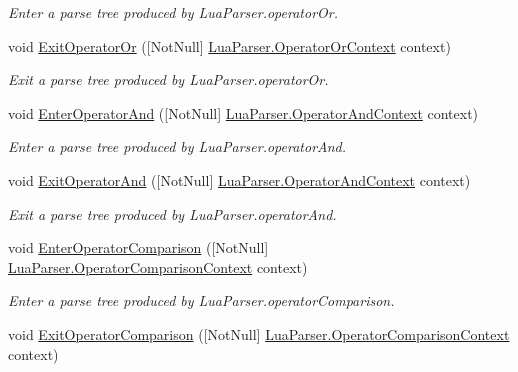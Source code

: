 \begin{DoxyCompactItemize}
\begin{DoxyCompactList}\small\item\em Enter a parse tree produced by Lua\+Parser.\+operator\+Or. \end{DoxyCompactList}\item 
void \mbox{\hyperlink{interfacezlua_1_1_i_lua_listener_adf5acf7049bb52ab0840b23bd5038a0a}{Exit\+Operator\+Or}} (\mbox{[}Not\+Null\mbox{]} \mbox{\hyperlink{classzlua_1_1_lua_parser_1_1_operator_or_context}{Lua\+Parser.\+Operator\+Or\+Context}} context)
\begin{DoxyCompactList}\small\item\em Exit a parse tree produced by Lua\+Parser.\+operator\+Or. \end{DoxyCompactList}\item 
void \mbox{\hyperlink{interfacezlua_1_1_i_lua_listener_aa0c0270aabb19cc89bce3c5823a2f012}{Enter\+Operator\+And}} (\mbox{[}Not\+Null\mbox{]} \mbox{\hyperlink{classzlua_1_1_lua_parser_1_1_operator_and_context}{Lua\+Parser.\+Operator\+And\+Context}} context)
\begin{DoxyCompactList}\small\item\em Enter a parse tree produced by Lua\+Parser.\+operator\+And. \end{DoxyCompactList}\item 
void \mbox{\hyperlink{interfacezlua_1_1_i_lua_listener_a5b2a0ab0a1e41daa744680bd657adfa8}{Exit\+Operator\+And}} (\mbox{[}Not\+Null\mbox{]} \mbox{\hyperlink{classzlua_1_1_lua_parser_1_1_operator_and_context}{Lua\+Parser.\+Operator\+And\+Context}} context)
\begin{DoxyCompactList}\small\item\em Exit a parse tree produced by Lua\+Parser.\+operator\+And. \end{DoxyCompactList}\item 
void \mbox{\hyperlink{interfacezlua_1_1_i_lua_listener_a5af42c94cc987459977c34f85b037120}{Enter\+Operator\+Comparison}} (\mbox{[}Not\+Null\mbox{]} \mbox{\hyperlink{classzlua_1_1_lua_parser_1_1_operator_comparison_context}{Lua\+Parser.\+Operator\+Comparison\+Context}} context)
\begin{DoxyCompactList}\small\item\em Enter a parse tree produced by Lua\+Parser.\+operator\+Comparison. \end{DoxyCompactList}\item 
void \mbox{\hyperlink{interfacezlua_1_1_i_lua_listener_a0c4de7c4814a744326fcf623c7ffc05c}{Exit\+Operator\+Comparison}} (\mbox{[}Not\+Null\mbox{]} \mbox{\hyperlink{classzlua_1_1_lua_parser_1_1_operator_comparison_context}{Lua\+Parser.\+Operator\+Comparison\+Context}} context)

\end{DoxyCompactItemize}
